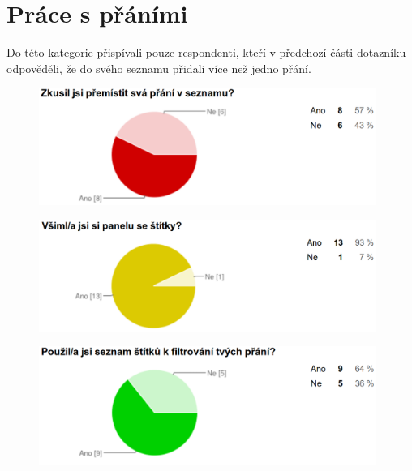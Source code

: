 \section{Práce s přáními}
Do této kategorie přispívali pouze respondenti, kteří v předchozí části dotazníku odpověděli, že do svého seznamu přidali více než jedno přání.
\begin{figure}[H]
\begin{center}
\includegraphics[width=110mm]{./pictures/dotaznik/vice-prani-01.png}
\label{fig:dot:vice-prani-01}
\end{center}
\end{figure}

\begin{figure}[H]
\begin{center}
\includegraphics[width=110mm]{./pictures/dotaznik/vice-prani-02.png}
\label{fig:dot:vice-prani-02}
\end{center}
\end{figure}

\begin{figure}[H]
\begin{center}
\includegraphics[width=110mm]{./pictures/dotaznik/vice-prani-03.png}
\label{fig:dot:vice-prani-03}
\end{center}
\end{figure}

